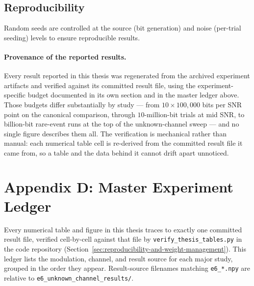 \subsection{Reproducibility} Random seeds are controlled at the source (bit generation) and noise (per-trial seeding) levels to ensure reproducible results.

\paragraph{Provenance of the reported results.} Every result reported in this thesis was regenerated from the archived experiment artifacts and verified against its committed result file, using the experiment-specific budget documented in its own section and in the master ledger above. Those budgets differ substantially by study --- from $10\times100{,}000$ bits per SNR point on the canonical comparison, through $10$-million-bit trials at mid SNR, to billion-bit rare-event runs at the top of the unknown-channel sweep --- and no single figure describes them all. The verification is mechanical rather than manual: each numerical table cell is re-derived from the committed result file it came from, so a table and the data behind it cannot drift apart unnoticed.

\clearpage

\section{Appendix D: Master Experiment Ledger}\label{sec:appendix-e-master-experiment-ledger}

Every numerical table and figure in this thesis traces to exactly one committed result file, verified cell-by-cell against that file by \texttt{verify\_thesis\_tables.py} in the code repository (Section~\ref{sec:reproducibility-and-weight-management}). This ledger lists the modulation, channel, and result source for each major study, grouped in the order they appear. Result-source filenames matching \texttt{e6\_*.npy} are relative to \texttt{e6\_unknown\_channel\_results/}.

